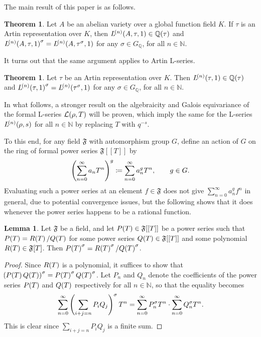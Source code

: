 \documentclass{article}
\theoremstyle{definition}
\newtheorem{lemma}[n]{Lemma}
\newtheorem{theorem}[n]{Theorem}
\theoremstyle{definition}
\newcommand{\FFFF}{\mathfrak{F}}
\newcommand{\LLL}{\mathcal{L}}
\newcommand{\NN}{\mathbb{N}}
\newcommand{\QQ}{\mathbb{Q}}
\newcommand{\br}{\!\del[0]}
\begin{document}
The main result of this paper is as follows.

\begin{theorem}
\label{thm:hasseweil}
Let $ A $ be an abelian variety over a global function field $ K $. If $ \tau $ is an Artin representation over $ K $, then $ L^{\br{n}}\br{A, \tau, 1} \in \QQ\br{\tau} $ and $ L^{\br{n}}\br{A, \tau, 1}^\sigma = L^{\br{n}}\br{A, \tau^\sigma, 1} $ for any $ \sigma \in G_\QQ $, for all $ n \in \NN $.
\end{theorem}

It turns out that the same argument applies to Artin L-series.

\begin{theorem}
\label{thm:artin}
Let $ \tau $ be an Artin representation over $ K $. Then $ L^{\br{n}}\br{\tau, 1} \in \QQ\br{\tau} $ and $ L^{\br{n}}\br{\tau, 1}^\sigma = L^{\br{n}}\br{\tau^\sigma, 1} $ for any $ \sigma \in G_\QQ $, for all $ n \in \NN $.
\end{theorem}

In what follows, a stronger result on the algebraicity and Galois equivariance of the formal L-series $ \LLL\br{\rho, T} $ will be proven, which imply the same for the L-series $ L^{\br{n}}\br{\rho, s} $ for all $ n \in \NN $ by replacing $ T $ with $ q^{-s} $.

\pagebreak

To this end, for any field $ \FFFF $ with automorphism group $ G $, define an action of $ G $ on the ring of formal power series $ \FFFF[[T]] $ by
$$ \del[4]{\sum_{n = 0}^\infty a_nT^n}^g \coloneqq \sum_{n = 0}^\infty a_n^g T^n, \qquad g \in G. $$
Evaluating such a power series at an element $ f \in \FFFF $ does not give $ \sum_{n = 0}^\infty a_n^gf^n $ in general, due to potential convergence issues, but the following shows that it does whenever the power series happens to be a rational function.

\begin{lemma}
\label{lem:powerseries}
Let $ \FFFF $ be a field, and let $ P\br{T} \in \FFFF[[T]] $ be a power series such that $ P\br{T} = R\br{T} / Q\br{T} $ for some power series $ Q\br{T} \in \FFFF[[T]] $ and some polynomial $ R\br{T} \in \FFFF\sbr{T} $. Then $ P\br{T}^\sigma = R\br{T}^\sigma / Q\br{T}^\sigma $.
\end{lemma}

\begin{proof}
Since $ R\br{T} $ is a polynomial, it suffices to show that $ \br{P\br{T}Q\br{T}}^\sigma = P\br{T}^\sigma Q\br{T}^\sigma $. Let $ P_n $ and $ Q_n $ denote the coefficients of the power series $ P\br{T} $ and $ Q\br{T} $ respectively for all $ n \in \NN $, so that the equality becomes
$$ \sum_{n = 0}^\infty \del[4]{\sum_{i + j = n} P_iQ_j}^\sigma T^n = \sum_{n = 0}^\infty P_n^\sigma T^n \cdot \sum_{n = 0}^\infty Q_n^\sigma T^n. $$
This is clear since $ \sum_{i + j = n} P_iQ_j $ is a finite sum.
\end{proof}
\end{document}
